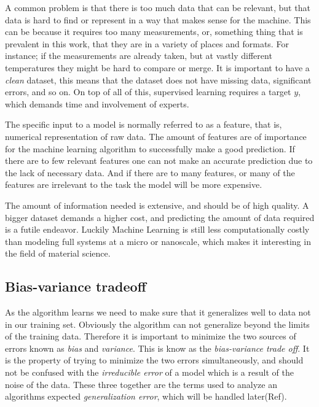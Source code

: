 	A common problem is that there is too much data that can be relevant, but that data is hard to find or represent in a way that makes sense for the machine. This can be because it requires too many measurements, or, something thing that is prevalent in this work, that they are in a variety of places and formats. For instance; if the measurements are already taken, but at vastly different temperatures they might be hard to compare or merge. It is important to have a \textit{clean} dataset, this means that the dataset does not have missing data, significant errors, and so on. On top of all of this, supervised learning requires a target $y$, which demands time and involvement of experts. 
	
	The specific input to a model is normally referred to as a feature, that is, numerical representation of raw data. The amount of features are of importance for the machine learning algorithm to successfully make a good prediction. If there are to few relevant features one can not make an accurate prediction due to the lack of necessary data. And if there are to many features, or many of the features are irrelevant to the task the model will be more expensive.
	
	The amount of information needed is extensive, and should be of high quality. A bigger dataset demands a higher cost, and predicting the amount of data required is a futile endeavor. Luckily Machine Learning is still less computationally costly than modeling full systems at a micro or nanoscale, which makes it interesting in the field of material science. 
	
	
\subsection{Bias-variance tradeoff}\label{sec:Bias-variance tradeoff}

As the algorithm learns we need to make sure that it generalizes well to data not in our training set. Obviously the algorithm can not generalize beyond the limits of the training data. Therefore it is important to minimize the two sources of errors known as \textit{bias} and \textit{variance}. This is know as the \textit{bias-variance trade off}. It is the property of trying to minimize the two errors simultaneously, and should not be confused with the \textit{irreducible error} of a model which is a result of the noise of the data. These three together are the terms used to analyze an algorithms expected \textit{generalization error}, which will be handled later(Ref).    


